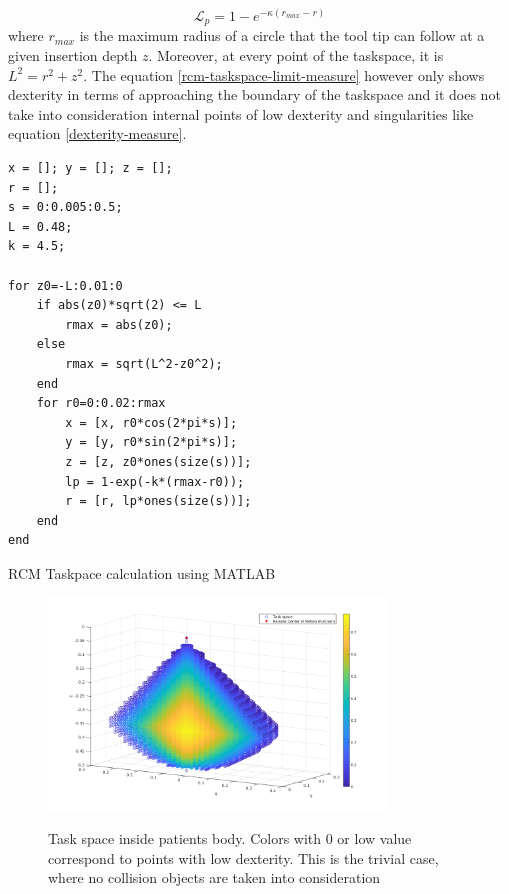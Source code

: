 \begin{equation}
\label{rcm-taskspace-limit-measure}
\mathcal{L}_{p}=1-e^{-\kappa (r_{max} - r)}
\end{equation}
where $r_{max}$ is the maximum radius of a circle that the tool tip can follow at a given insertion depth $z$. Moreover, at every point of the taskspace, it is $L^2 = r^2 + z^2$. 
The equation \ref{rcm-taskspace-limit-measure} however only shows dexterity in terms of approaching the boundary of the taskspace and it does not take into consideration internal points of low 
dexterity and singularities like equation \ref{dexterity-measure}.

\begin{listing}[H]
\begin{verbatim}
x = []; y = []; z = [];
r = [];
s = 0:0.005:0.5;
L = 0.48;
k = 4.5;

for z0=-L:0.01:0
    if abs(z0)*sqrt(2) <= L
        rmax = abs(z0);
    else
        rmax = sqrt(L^2-z0^2);
    end
    for r0=0:0.02:rmax
        x = [x, r0*cos(2*pi*s)];
        y = [y, r0*sin(2*pi*s)];
        z = [z, z0*ones(size(s))];
        lp = 1-exp(-k*(rmax-r0));
        r = [r, lp*ones(size(s))];
    end
end
\end{verbatim}
\caption{RCM Taskpace calculation using MATLAB}
\label{code:rcm_taskspace_matlab}
\end{listing}

\begin{center}
\begin{figure}[H]
\centering
\includegraphics[width=0.8\textwidth]{images/rcm_taskspace.png}\\
\caption{Task space inside patients body. Colors with 0 or low value correspond to points with low dexterity. This is the trivial case, where no collision objects are taken into consideration}
\end{figure}
\end{center}